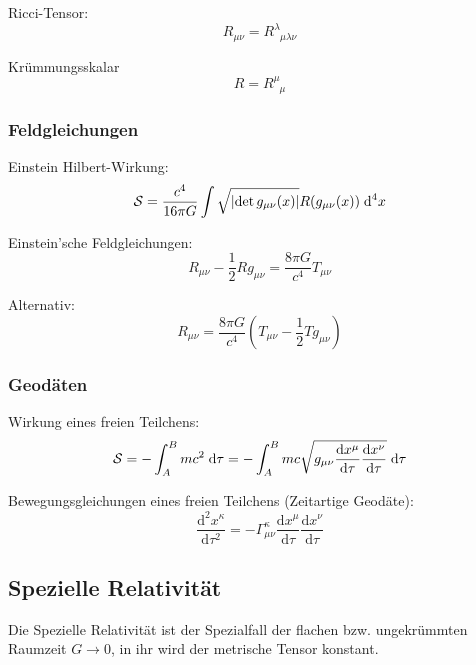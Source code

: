 \documentclass[11pt]{article}
\numberwithin{equation}{section}
\begin{document}
				\noindent
				Ricci-Tensor:
				\begin{equation}
					R_{\mu\nu} = R^\lambda_{\phantom{\lambda}\mu\lambda\nu}
				\end{equation}

				\noindent
				Krümmungsskalar
				\begin{equation}
					R = R^\mu_{\phantom{\mu}\mu}
				\end{equation}

			\subsubsection{Feldgleichungen}
				\noindent
				Einstein Hilbert-Wirkung:
				\begin{equation}
					\mathcal{S} = \frac{c^4}{16\pi G} \int \sqrt{\left|\det{g_{\mu\nu}(x)}\right|} R(g_{\mu\nu}(x))\;\mathrm{d}^4 x
				\end{equation}

				\noindent
				Einstein'sche Feldgleichungen:
				\begin{equation}
					R_{\mu\nu} - \frac{1}{2} R g_{\mu\nu} = \frac{8\pi G}{c^4} T_{\mu\nu}
				\end{equation}

				\noindent
				Alternativ:
				\begin{equation}
					R_{\mu\nu} = \frac{8\pi G}{c^4} \left( T_{\mu\nu} - \frac{1}{2} T g_{\mu\nu} \right)
				\end{equation}


			\subsubsection{Geodäten}
				\noindent
				Wirkung eines freien Teilchens:
				\begin{equation}
					\mathcal{S} = -\int_A^B mc^2\;\mathrm{d} \tau = -\int_A^B mc\sqrt{g_{\mu\nu} \frac{\mathrm{d} x^\mu}{\mathrm{d} \tau} \frac{\mathrm{d} x^\nu}{\mathrm{d} \tau}} \;\mathrm{d} \tau
				\end{equation}

				\noindent
				Bewegungsgleichungen eines freien Teilchens (Zeitartige Geodäte):
				\begin{equation}
					\frac{\mathrm{d}^2 x^\kappa}{\mathrm{d}\tau^2}=-\Gamma_{\mu\nu}^{\kappa}\frac{\mathrm{d}x^\mu}{\mathrm{d}\tau}\frac{\mathrm{d}x^\nu}{\mathrm{d}\tau}
				\end{equation}

		\subsection{Spezielle Relativität}
			\noindent
			Die Spezielle Relativität ist der Spezialfall der flachen bzw. ungekrümmten Raumzeit $G\rightarrow 0$, in ihr wird der metrische Tensor konstant.
\end{document}
